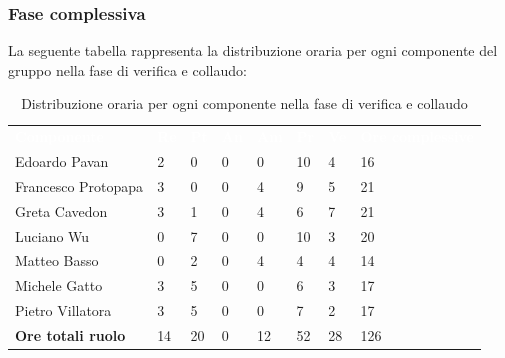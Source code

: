 \subsubsection{Fase complessiva}
La seguente tabella rappresenta la distribuzione oraria per ogni componente del gruppo nella fase di verifica e collaudo:
\begin{table}[H]
\begin{center}
\renewcommand{\arraystretch}{1.25}
\begin{tabular}{ m{}<{\centering}  m{}<{\centering} m{}<{\centering} m{}<{\centering}  m{}<{\centering}  m{}<{\centering}  m{}<{\centering}  m{}<{\centering}   }
	\rowcolor{darkblue}
	\textcolor{white}{\textbf{Componente}} &\textcolor{white}{\textbf{Re}}&\textcolor{white}{\textbf{Pt}}&\textcolor{white}{\textbf{An}}&\textcolor{white}{\textbf{Am}}&\textcolor{white}{\textbf{Pr}}&\textcolor{white}{\textbf{Ve}}&\textcolor{white}{\textbf{Ore complessive}}\\ 
	Edoardo Pavan & 2 & 0 & 0 & 0 & 10 & 4 & 16 \\	
	
	Francesco Protopapa & 3 & 0 & 0 & 4 & 9 & 5 & 21 \\

	Greta Cavedon & 3 & 1 & 0 & 4 & 6 & 7 & 21 \\
	
	Luciano Wu & 0 & 7 & 0 & 0 & 10 & 3 & 20 \\
	
	Matteo Basso & 0 & 2 & 0 & 4 & 4 & 4 & 14 \\
	
	Michele Gatto & 3 & 5 & 0 & 0 & 6 & 3 & 17 \\
	
	Pietro Villatora & 3 & 5 & 0 & 0 & 7 & 2 & 17 \\
	
	\textbf{Ore totali ruolo} & 14 & 20 & 0 & 12 & 52 & 28 & 126\\

\end{tabular}
\caption{Distribuzione oraria per ogni componente nella fase di verifica e collaudo}
\end{center}
\end{table}

